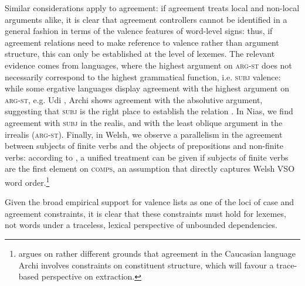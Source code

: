 \documentclass[output=paper
	        ,collection
	        ,collectionchapter
 	        ,biblatex
                ,babelshorthands
                ,newtxmath
                ,draftmode
                ,colorlinks, citecolor=brown
]{langscibook}
\begin{document}
{Similar considerations apply to agreement: if agreement treats local
and non-local arguments alike, it is clear that agreement controllers
cannot be identified in a general fashion in terms of the valence
features of word-level signs: thus, if agreement relations need to make
reference to valence rather than argument structure, this can only be
established at the level of lexemes. The relevant evidence comes from
languages, where the highest argument on \textsc{arg-st} does not
necessarily correspond to the highest grammatical function, i.e.
\textsc{subj} valence: while some ergative languages display agreement
with the highest argument on \textsc{arg-st}, e.g. Udi
\citep{harris_a84udi}, Archi \citep{kibrik94:_archi} shows agreement
with the absolutive argument, suggesting that \textsc{subj} is the
right place to establish the relation
\citep{Crysmann:09}. %
In Nias, we find agreement with \textsc{subj} in the realis, and with
the least oblique argument in the irrealis (\textsc{arg-st}). Finally,
in Welsh, we observe a parallelism in the agreement between subjects
of finite verbs and the objects of prepositions and non-finite verbs:
according to \citet{Borsley89}, a unified treatment can be given if
subjects of finite verbs are the first element on \textsc{comps}, an
assumption that directly captures Welsh VSO word order.\footnote{
  \citet[Section~5.4]{Borsley:16:Archi} argues on rather different grounds that
  agreement in the Caucasian language Archi involves constraints on
  constituent structure, which will favour a trace-based perspective on
  extraction. }

Given the broad empirical support for valence lists as one of the loci
of case and agreement constraints, it is clear that these constraints
must hold for lexemes, not words under a traceless, lexical
perspective of unbounded dependencies.









}
\end{document}
